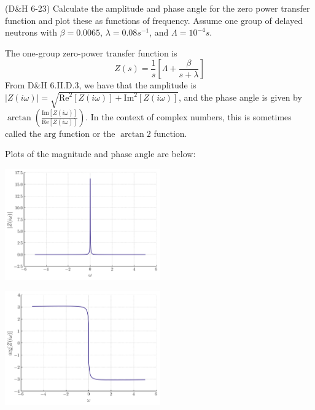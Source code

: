 \documentclass[11pt,addpoints,answers]{exam}
\begin{document}
\begin{questions}
        \question[30] (D\&H 6-23) Calculate the amplitude and phase angle for the 
        zero power transfer function and plot these as functions of frequency. 
        Assume one group of delayed neutrons with $\beta = 0.0065$, $\lambda = 
        0.08s^{-1}$, and $\Lambda = 10^{-4}s$.
                \begin{solution}
                    The one-group zero-power transfer function is
                    \[
                        Z(s) = \frac{1}{s}\left[\Lambda + \frac{\beta}{s +
                        \lambda}\right]
                    \]
                    From D\&H 6.II.D.3, we have that the amplitude is
                    $|Z(i\omega)| = \sqrt{\text{Re}^{2}[Z(i\omega)] +
                    \text{Im}^{2}[Z(i\omega)]}$, and the phase angle is given by
                    $\arctan(\frac{\text{Im}[Z(i\omega)]}{\text{Re}[Z(i\omega)]
                    })$. In the context of complex numbers, this is sometimes
                    called the $\text{arg}$ function or the $\arctan 2$
                    function.

                    Plots of the magnitude and phase angle are below:

                    \begin{center}
                        \centering
                        \includegraphics[width=0.5\textwidth]{figs/magnitude.png}
                    \end{center}
                    \begin{center}
                        \centering
                        \includegraphics[width=0.5\textwidth]{figs/phase.png}
                    \end{center}




\end{solution}
\end{questions}
\end{document}
